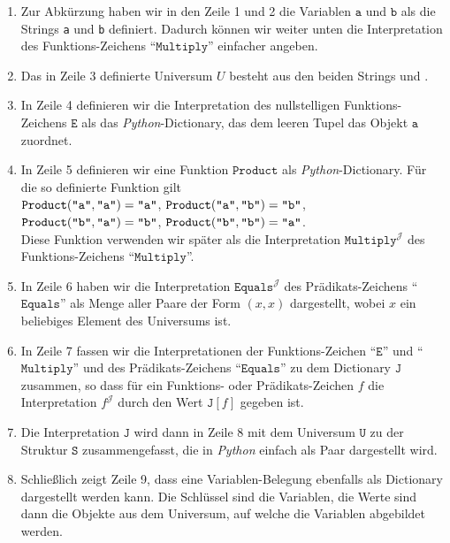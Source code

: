 \begin{enumerate}
\item Zur Abkürzung haben wir in den Zeile 1 und 2 die Variablen $\texttt{a}$ und $\texttt{b}$
      als die Strings \texttt{a} und \texttt{b}
      definiert.  Dadurch können wir weiter unten die Interpretation des
      Funktions-Zeichens ``$\texttt{Multiply}$'' einfacher angeben.
\item Das in Zeile 3 definierte Universum $U$ besteht aus den beiden Strings  und .
      
\item In Zeile 4 definieren wir die Interpretation des nullstelligen Funktions-Zeichens $\texttt{E}$
      als das \textsl{Python}-Dictionary, das dem leeren Tupel das Objekt $\texttt{a}$ zuordnet.
\item In Zeile 5 definieren wir eine Funktion $\texttt{Product}$ als \textsl{Python}-Dictionary.  Für
      die so definierte Funktion gilt
      \\[0.2cm]
      \hspace*{1.3cm}
      $\mathtt{Product}(\quoted{a},\quoted{a}) = \quoted{a}$, \quad
      $\mathtt{Product}(\quoted{a},\quoted{b}) = \quoted{b}$, 
      \\[0.2cm]
      \hspace*{1.3cm}
      $\mathtt{Product}(\quoted{b},\quoted{a}) = \quoted{b}$, \quad
      $\mathtt{Product}(\quoted{b},\quoted{b}) = \quoted{a}$.
      \\[0.2cm]  
      Diese Funktion verwenden wir später als die Interpretation $\texttt{Multiply}^\mathcal{J}$ des Funktions-Zeichens ``$\texttt{Multiply}$''.
\item In Zeile 6 haben wir  die Interpretation $\texttt{Equals}^\mathcal{J}$ des
      Prädikats-Zeichens ``$\texttt{Equals}$'' als Menge aller Paare der Form $(x, x)$ dargestellt, wobei $x$ ein beliebiges
      Element des Universums ist.
\item In Zeile 7 fassen wir die Interpretationen der Funktions-Zeichen ``$\texttt{E}$'' und
      ``$\texttt{Multiply}$'' und des Prädikats-Zeichens ``$\texttt{Equals}$'' zu dem Dictionary $\texttt{J}$
      zusammen, so dass für ein Funktions- oder Prädikats-Zeichen $f$ die Interpretation $f^\mathcal{J}$ durch
      den Wert $\texttt{J}[f]$ gegeben ist. 
\item Die Interpretation $\texttt{J}$ wird dann in Zeile 8 mit dem
      Universum $\texttt{U}$ zu der Struktur $\texttt{S}$ zusammengefasst, die in \textsl{Python} einfach als
      Paar dargestellt wird.
\item Schließlich zeigt Zeile 9, dass eine
      Variablen-Belegung ebenfalls als Dictionary dargestellt werden kann.  Die Schlüssel
      sind die Variablen, die Werte sind dann die Objekte aus dem Universum, auf welche die Variablen
      abgebildet werden.
\end{enumerate}


